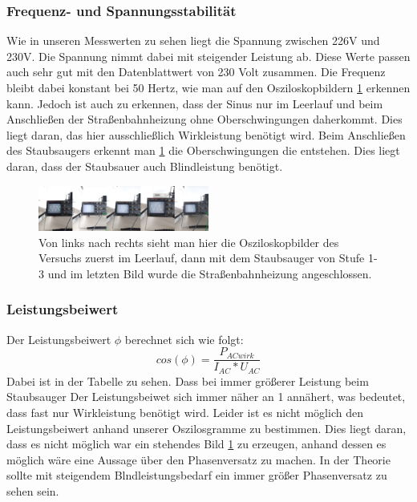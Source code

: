 \subsubsection{Frequenz- und Spannungsstabilität}
Wie in unseren Messwerten zu sehen liegt die Spannung zwischen 226V und 230V. Die Spannung nimmt dabei mit steigender Leistung ab. Diese Werte passen auch sehr gut mit den Datenblattwert von 230 Volt zusammen. Die Frequenz bleibt dabei konstant bei 50 Hertz, wie man auf den Osziloskopbildern \ref{fig:oszi} erkennen kann. Jedoch ist auch zu erkennen, dass der Sinus nur im Leerlauf und beim Anschließen der Straßenbahnheizung ohne Oberschwingungen daherkommt. Dies liegt daran, das hier ausschließlich Wirkleistung benötigt wird. Beim Anschließen des Staubsaugers erkennt man \ref{fig:oszi} die Oberschwingungen die entstehen. Dies liegt daran, dass der Staubsauer auch Blindleistung benötigt.
%
\begin{figure}[!h]
		\centering
		\includegraphics[width=0.5\textwidth]{Abbildungen/MergedImages}
		\caption{Von links nach rechts sieht man hier die Osziloskopbilder des Versuchs zuerst im Leerlauf, dann mit dem Staubsauger von Stufe 1-3 und im letzten Bild wurde die Straßenbahnheizung angeschlossen.}
		\label{fig:oszi}
\end{figure}
%
\subsubsection{Leistungsbeiwert}
Der Leistungsbeiwert $ \phi $ berechnet sich wie folgt:
%
\begin{equation}
	cos(\phi)=\frac{ P_{ ACwirk } }{  I_{ AC }*U_{AC }}
\end{equation}
%
Dabei ist in der Tabelle zu sehen. Dass bei immer größerer Leistung beim Staubsauger Der Leistungsbeiwet sich immer näher an 1 annähert, was bedeutet, dass fast nur Wirkleistung benötigt wird. Leider ist es nicht möglich den Leistungsbeiwert anhand unserer Oszilosgramme zu bestimmen. Dies liegt daran, dass es nicht möglich war ein stehendes Bild \ref{fig:oszi}  zu erzeugen, anhand dessen es möglich wäre eine Aussage über den Phasenversatz zu machen. In der Theorie sollte mit steigendem Blndleistungsbedarf ein immer größer Phasenversatz zu sehen sein.
